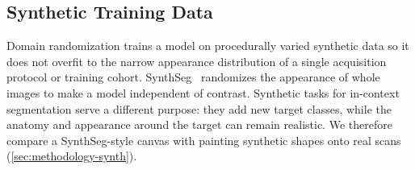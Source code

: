 \subsection{Synthetic Training Data}\label{sec:fundamentals-synthdata}

Domain randomization trains a model on procedurally varied synthetic data
so it does not overfit to the narrow appearance distribution of a single
acquisition protocol or training cohort. SynthSeg~\cite{billot2023synthseg} randomizes the appearance of whole images to make a model independent
of contrast. Synthetic tasks for in-context segmentation serve a different
purpose: they add new target classes, while the anatomy and appearance around
the target can remain realistic. We therefore compare a SynthSeg-style canvas
with painting synthetic shapes onto real scans (\autoref{sec:methodology-synth}).
